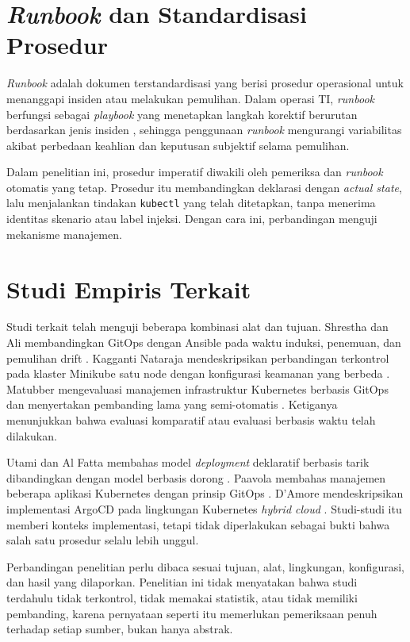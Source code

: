 \section{\textit{Runbook} dan Standardisasi Prosedur}

\textit{Runbook} adalah dokumen terstandardisasi yang berisi prosedur operasional untuk menanggapi insiden atau melakukan pemulihan. Dalam operasi TI, \textit{runbook} berfungsi sebagai \textit{playbook} yang menetapkan langkah korektif berurutan berdasarkan jenis insiden \citep{schlette2024playbook}, sehingga penggunaan \textit{runbook} mengurangi variabilitas akibat perbedaan keahlian dan keputusan subjektif selama pemulihan.

Dalam penelitian ini, prosedur imperatif diwakili oleh pemeriksa dan \textit{runbook} otomatis yang tetap. Prosedur itu membandingkan deklarasi dengan \textit{actual state}, lalu menjalankan tindakan \texttt{kubectl} yang telah ditetapkan, tanpa menerima identitas skenario atau label injeksi. Dengan cara ini, perbandingan menguji mekanisme manajemen.

\section{Studi Empiris Terkait}

Studi terkait telah menguji beberapa kombinasi alat dan tujuan. Shrestha dan Ali membandingkan GitOps dengan Ansible pada waktu induksi, penemuan, dan pemulihan drift \citep{shrestha2024configuration}. Kagganti Nataraja mendeskripsikan perbandingan terkontrol pada klaster Minikube satu node dengan konfigurasi keamanan yang berbeda \citep{kaggantinataraja2025security}. Matubber mengevaluasi manajemen infrastruktur Kubernetes berbasis GitOps dan menyertakan pembanding lama yang semi-otomatis \citep{matubber2025managing}. Ketiganya menunjukkan bahwa evaluasi komparatif atau evaluasi berbasis waktu telah dilakukan.

Utami dan Al Fatta membahas model \textit{deployment} deklaratif berbasis tarik dibandingkan dengan model berbasis dorong \citep{utami2021analysis}. Paavola membahas manajemen beberapa aplikasi Kubernetes dengan prinsip GitOps \citep{paavola2021managing}. D'Amore mendeskripsikan implementasi ArgoCD pada lingkungan Kubernetes \textit{hybrid cloud} \citep{damore2021gitops}. Studi-studi itu memberi konteks implementasi, tetapi tidak diperlakukan sebagai bukti bahwa salah satu prosedur selalu lebih unggul.

Perbandingan penelitian perlu dibaca sesuai tujuan, alat, lingkungan, konfigurasi, dan hasil yang dilaporkan. Penelitian ini tidak menyatakan bahwa studi terdahulu tidak terkontrol, tidak memakai statistik, atau tidak memiliki pembanding, karena pernyataan seperti itu memerlukan pemeriksaan penuh terhadap setiap sumber, bukan hanya abstrak.

